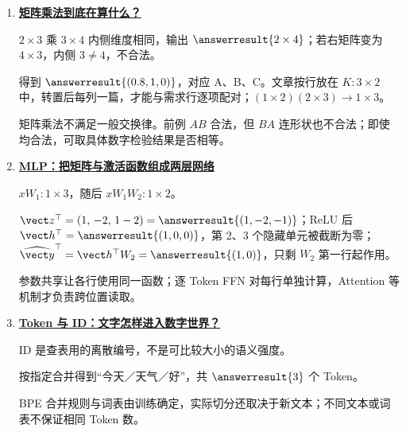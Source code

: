 \begin{enumerate}[leftmargin=5.4em,labelsep=.7em,itemsep=9pt]
\item[\textbf{第 7 章}] \label{answer:03-matrix-multiplication}\textbf{\hyperref[check:03-matrix-multiplication]{矩阵乘法到底在算什么？}}\par\nobreak
{}$2\times3$ 乘 $3\times4$ 内侧维度相同，输出 $\answerresult{2\times4}$；若右矩阵变为 $4\times3$，内侧 $3\ne4$，不合法。
\par{}得到 $\answerresult{(0.8,1,0)}$，对应 A、B、C。文章按行放在 $K:3\times2$ 中，转置后每列一篇，才能与需求行逐项配对；$(1\times2)(2\times3)\to1\times3$。
\par{}矩阵乘法不满足一般交换律。前例 $AB$ 合法，但 $BA$ 连形状也不合法；即使均合法，可取具体数字检验结果是否相等。
\par{}
\item[\textbf{第 8 章}] \label{answer:10-mlp}\textbf{\hyperref[check:10-mlp]{MLP：把矩阵与激活函数组成两层网络}}\par\nobreak
{}$xW_1:1\times3$，随后 $xW_1W_2:1\times2$。
\par{}$\vect z^\top=(1,\,-2,\,1-2)=\answerresult{(1,-2,-1)}$；ReLU 后 $\vect h^\top=\answerresult{(1,0,0)}$，第 2、3 个隐藏单元被截断为零；$\widehat{\vect y}^\top=\vect h^\top W_2=\answerresult{(1,0)}$，只剩 $W_2$ 第一行起作用。
\par{}参数共享让各行使用同一函数；逐 Token FFN 对每行单独计算，Attention 等机制才负责跨位置读取。
\par{}
\item[\textbf{第 9 章}] \label{answer:20a-tokenizer}\textbf{\hyperref[check:20a-tokenizer]{Token 与 ID：文字怎样进入数字世界？}}\par\nobreak
{}ID 是查表用的离散编号，不是可比较大小的语义强度。
\par{}按指定合并得到“今天／天气／好”，共 $\answerresult{3}$ 个 Token。
\par{}BPE 合并规则与词表由训练确定，实际切分还取决于新文本；不同文本或词表不保证相同 Token 数。

\end{enumerate}
